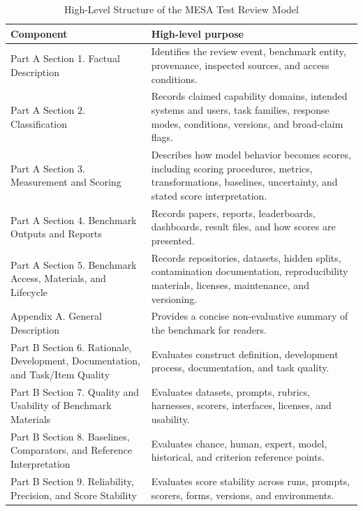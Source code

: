 \documentclass[conference]{IEEEtran}
\begin{document}
    \begin{table}[t]
    \caption{High-Level Structure of the MESA Test Review Model}
    \label{tab:mesa-review-structure}
    \centering
    \scriptsize
    \begin{tabularx}{\textwidth}{@{}>{\raggedright\arraybackslash}p{}>{\raggedright\arraybackslash}X@{}}
    \toprule
    Component & High-level purpose \\
    \midrule
    Part A Section 1. Factual Description & Identifies the review event, benchmark entity, provenance, inspected sources, and access conditions. \\ \hline
    Part A Section 2. Classification & Records claimed capability domains, intended systems and users, task families, response modes, conditions, versions, and broad-claim flags. \\ \hline
    Part A Section 3. Measurement and Scoring & Describes how model behavior becomes scores, including scoring procedures, metrics, transformations, baselines, uncertainty, and stated score interpretation. \\ \hline
    Part A Section 4. Benchmark Outputs and Reports & Records papers, reports, leaderboards, dashboards, result files, and how scores are presented. \\ \hline
    Part A Section 5. Benchmark Access, Materials, and Lifecycle & Records repositories, datasets, hidden splits, contamination documentation, reproducibility materials, licenses, maintenance, and versioning. \\ \hline
    Appendix A. General Description & Provides a concise non-evaluative summary of the benchmark for readers. \\ \hline
    Part B Section 6. Rationale, Development, Documentation, and Task/Item Quality & Evaluates construct definition, development process, documentation, and task quality. \\ \hline
    Part B Section 7. Quality and Usability of Benchmark Materials & Evaluates datasets, prompts, rubrics, harnesses, scorers, interfaces, licenses, and usability. \\ \hline
    Part B Section 8. Baselines, Comparators, and Reference Interpretation & Evaluates chance, human, expert, model, historical, and criterion reference points. \\ \hline
    Part B Section 9. Reliability, Precision, and Score Stability & Evaluates score stability across runs, prompts, scorers, forms, versions, and environments. \\ \hline

\end{tabularx}
\end{table}
\end{document}

